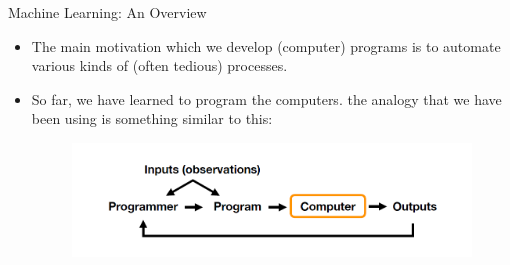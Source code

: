 \documentclass[compress,oilve]{beamer}
\begin{document}


\begin{frame}{Machine Learning: An Overview}
\begin{itemize}
\item The main motivation which we develop (computer) programs is to automate various
kinds of (often tedious) processes.
\item So far, we have learned to program the computers. the analogy that we have been using is something similar to this:\\
\begin{figure}
\center \includegraphics[scale=0.5]{1}
\end{figure}
\end{itemize}
\end{frame}
\end{document}
